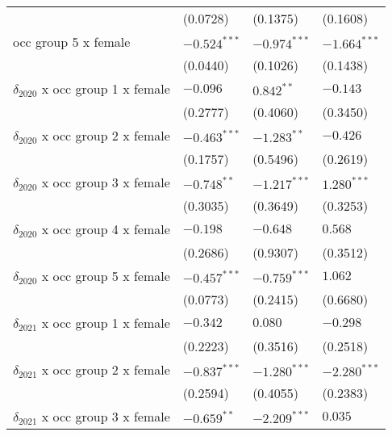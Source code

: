 \begin{tabular}{llll}
                                       &           (0.0728) &           (0.1375) &           (0.1608) \\
occ group 5 x female                   &     $-0.524^{***}$ &     $-0.974^{***}$ &     $-1.664^{***}$ \\
                                       &           (0.0440) &           (0.1026) &           (0.1438) \\
$\delta_{2020}$ x occ group 1 x female &           $-0.096$ &       $0.842^{**}$ &           $-0.143$ \\
                                       &           (0.2777) &           (0.4060) &           (0.3450) \\
$\delta_{2020}$ x occ group 2 x female &     $-0.463^{***}$ &      $-1.283^{**}$ &           $-0.426$ \\
                                       &           (0.1757) &           (0.5496) &           (0.2619) \\
$\delta_{2020}$ x occ group 3 x female &      $-0.748^{**}$ &     $-1.217^{***}$ &      $1.280^{***}$ \\
                                       &           (0.3035) &           (0.3649) &           (0.3253) \\
$\delta_{2020}$ x occ group 4 x female &           $-0.198$ &           $-0.648$ &            $0.568$ \\
                                       &           (0.2686) &           (0.9307) &           (0.3512) \\
$\delta_{2020}$ x occ group 5 x female &     $-0.457^{***}$ &     $-0.759^{***}$ &            $1.062$ \\
                                       &           (0.0773) &           (0.2415) &           (0.6680) \\
$\delta_{2021}$ x occ group 1 x female &           $-0.342$ &            $0.080$ &           $-0.298$ \\
                                       &           (0.2223) &           (0.3516) &           (0.2518) \\
$\delta_{2021}$ x occ group 2 x female &     $-0.837^{***}$ &     $-1.280^{***}$ &     $-2.280^{***}$ \\
                                       &           (0.2594) &           (0.4055) &           (0.2383) \\
$\delta_{2021}$ x occ group 3 x female &      $-0.659^{**}$ &     $-2.209^{***}$ &            $0.035$ \\

\end{tabular}
